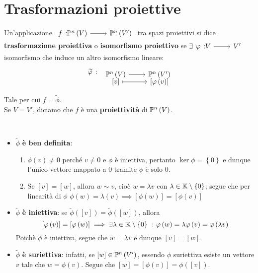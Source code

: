 \section{Trasformazioni proiettive}
\begin{define}
	Un'applicazione $\funz{f}{\proj{V}}{\proj{V'}}$ tra spazi proiettivi si dice \textbf{trasformazione proiettiva} o \textbf{isomorfismo proiettivo} se $\exists \funz{\phi}{V}{V'}$ isomorfismo che induce un altro isomorfismo lineare:
	\begin{equation}
		\begin{tikzcd}
			\widetilde{\phi}\ \colon\\
		\end{tikzcd}
			\funztot{\ }{\proj{V}}{\proj{V'}}{\left[v\right]}{\left[\phi\left(v\right)\right]}
	\end{equation}
	Tale per cui $f=\widetilde{\phi}$.\\
	Se $V=V'$, diciamo che $f$ è una \textbf{proiettività} di $\proj{V}$.
\end{define}
\begin{demonstration}~{}
	\begin{itemize}
		\item $\widetilde{\phi}$ \textbf{è ben definita}:
		\begin{enumerate}
			\item $\phi\left(v\right)\neq 0$ perché $v\neq 0$ e $\phi$ è iniettiva, pertanto $\ker\phi=\left\{0\right\}$ e dunque l'unico vettore mappato a $0$ tramite $\phi$ è solo $0$.
			\item Se $\left[v\right]=\left[w\right]$, allora $w\sim v$, cioè $w=\lambda v$ con $\lambda\in\mathbb{K}\setminus\left\{0\right\}$; segue che per linearità di $\phi$ $\phi\left(w\right)=\lambda \left(v\right)\implies \left[\phi\left(w\right)\right]=\left[\phi\left(v\right)\right]$
		\end{enumerate}
		\item $\widetilde{\phi}$ \textbf{è iniettiva}: se $\widetilde{\phi}\left(\left[v\right]\right)=\widetilde{\phi}\left(\left[w\right]\right)$, allora
		\begin{equation*}
			\left[\phi\left(v\right)\right]=\left[\phi\left(w\right)\right]\implies\exists\lambda\in\kamp\setminus\left\{0\right\}\ \colon\phi\left(w\right)=\lambda\phi\left(v\right)=\phi\left(\lambda v\right)
		\end{equation*}
	Poichè $\phi$ è iniettiva, segue che $w=\lambda v$ e dunque $\left[v\right]=\left[w\right]$.
		\item $\widetilde{\phi}$ \textbf{è suriettiva}: infatti, se $\left[w\right]\in\proj{V'}$, essendo $\phi$ suriettiva esiste un vettore $v$ tale che $w=\phi\left(v\right)$. Segue che $\left[w\right]=\left[\phi\left(v\right)\right]=\phi\left(\left[v\right]\right)$.
	\end{itemize}
\end{demonstration}
